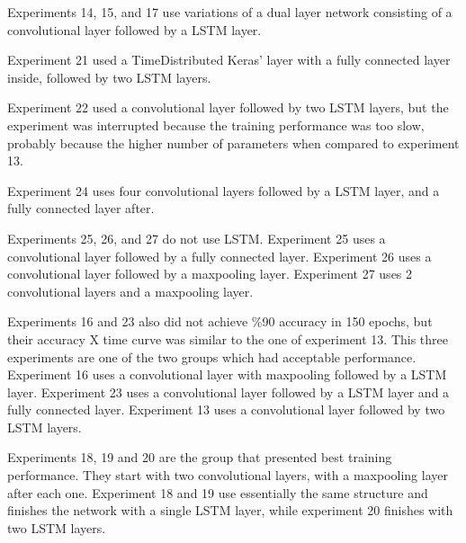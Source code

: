 Experiments 14, 15, and 17 use variations of a dual layer network consisting of a convolutional layer followed by a LSTM layer.

Experiment 21 used a TimeDistributed Keras' layer with a fully connected layer inside, followed by two LSTM layers.

Experiment 22 used a convolutional layer followed by two LSTM layers, but the experiment was interrupted because the training performance was too slow, probably because the higher number of parameters when compared to experiment 13.

Experiment 24 uses four convolutional layers followed by a LSTM layer, and a fully connected layer after.

Experiments 25, 26, and 27 do not use LSTM. Experiment 25 uses a convolutional layer followed by a fully connected layer. Experiment 26 uses a convolutional layer followed by a maxpooling layer. Experiment 27 uses 2 convolutional layers and a maxpooling layer.



Experiments 16 and 23 also did not achieve \%90 accuracy in 150 epochs, but their accuracy X time curve was similar to the one of experiment 13. This three experiments are one of the two groups which had acceptable performance.
Experiment 16 uses a convolutional layer with maxpooling followed by a LSTM layer. Experiment 23 uses a convolutional layer followed by a LSTM layer and a fully connected layer.
Experiment 13 uses a convolutional layer followed by two LSTM layers.


Experiments 18, 19 and 20 are the group that presented best training performance. They start with two convolutional layers, with a maxpooling layer after each one. Experiment 18 and 19 use essentially the same structure and finishes the network with a single LSTM layer, while experiment 20 finishes with two LSTM layers.


